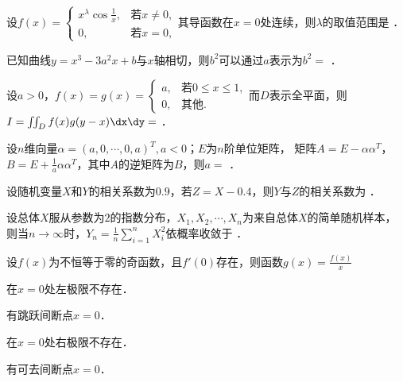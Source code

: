 \documentclass[plain,noanswer,medmath]{../../template/jnuexam}
\begin{document}




\begin{problem}
设$f(x) = \begin{cases}
  x^{\lambda}\cos \frac{1}{x}, & \text{若$x \ne 0$}, \\
                            0, & \text{若$x = 0$},
\end{cases}$其导函数在$x = 0$处连续，则$\lambda$的取值范围是 \fillin{}．
\end{problem}


\begin{problem}
已知曲线$y = x^3 - 3a^2 x + b$与$x$轴相切，则$b^2$可以通过$a$表示为$b^2 =$ \fillin{}．
\end{problem}


\begin{problem}
设$a > 0$，$f(x) = g(x) = \begin{cases}
  a, & \text{若$0 \le x \le 1$}, \\
  0, & \text{其他}.
\end{cases}$而$D$表示全平面，则\goodbreak$I = \iint_D f(x)g(y - x)\dx\dy =$ \fillin{}．
\end{problem}


\begin{problem}
设$n$维向量$\alpha = (a,0, \cdots ,0,a)^T,a < 0$；$E$为$n$阶单位矩阵，
矩阵$A = E - \alpha \alpha^T$，$B = E + \frac{1}{a}\alpha \alpha^T$，其中$A$的逆矩阵为$B$，则$a =$ \fillin{}．
\end{problem}


\begin{problem}
设随机变量$X$和$Y$的相关系数为$0.9$，若$Z = X - 0.4$，则$Y$与$Z$的相关系数为 \fillin{}．
\end{problem}


\begin{problem}
设总体$X$服从参数为$2$的指数分布，$X_1,X_2, \cdots ,X_n$为来自总体$X$的简单随机样本，
则当$n \to \infty$时，$Y_n = \frac{1}{n}\sum_{i = 1}^n X_i^2$依概率收敛于 \fillin{}．
\end{problem}




\begin{problem}
设$f(x)$为不恒等于零的奇函数，且$f'(0)$存在，则函数$g(x) = \frac{f(x)}{x}$\pickout{}
\begin{abcd}
\item 在$x = 0$处左极限不存在．
\item 有跳跃间断点$x = 0$．
\item 在$x = 0$处右极限不存在．
\item 有可去间断点$x = 0$．
\end{abcd}
\end{problem}
\end{document}
